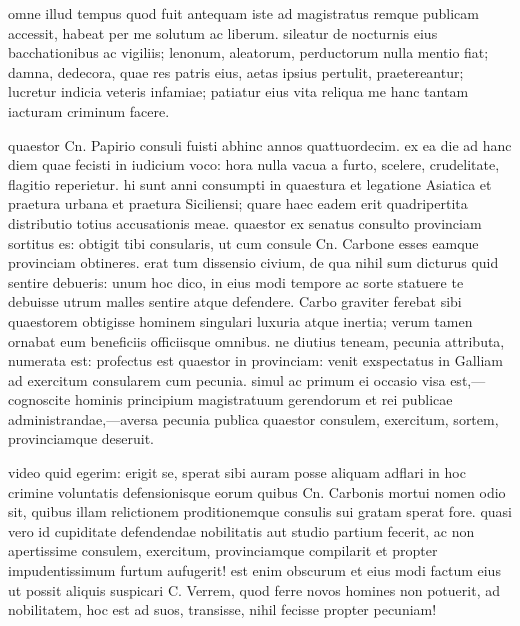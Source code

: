  omne illud tempus quod fuit antequam iste ad magistratus remque publicam accessit, habeat per me solutum ac liberum. sileatur de nocturnis eius bacchationibus ac vigiliis; lenonum, aleatorum, perductorum nulla mentio fiat; damna, dedecora, quae res patris eius, aetas ipsius pertulit, praetereantur; lucretur indicia veteris infamiae; patiatur eius vita reliqua me hanc tantam iacturam criminum facere.

 quaestor Cn. Papirio consuli fuisti abhinc annos quattuordecim. ex ea die ad hanc diem quae fecisti in iudicium voco: hora nulla vacua a furto, scelere, crudelitate, flagitio reperietur. hi sunt anni consumpti in quaestura et legatione Asiatica et praetura urbana et praetura Siciliensi; quare haec eadem erit quadripertita distributio totius accusationis meae. quaestor ex senatus consulto provinciam sortitus es: obtigit tibi consularis, ut cum consule Cn. Carbone esses eamque provinciam obtineres. erat tum dissensio civium, de qua nihil sum dicturus quid sentire debueris: unum hoc dico, in eius modi tempore ac sorte statuere te debuisse utrum malles sentire atque defendere. Carbo graviter ferebat sibi quaestorem obtigisse hominem singulari luxuria atque inertia; verum tamen ornabat eum beneficiis officiisque omnibus. ne diutius teneam, pecunia attributa, numerata est: profectus est quaestor in provinciam: venit exspectatus in Galliam ad exercitum consularem cum pecunia. simul ac primum ei occasio visa est,—cognoscite hominis principium magistratuum gerendorum et rei publicae administrandae,—aversa pecunia publica quaestor consulem, exercitum, sortem, provinciamque deseruit.

 video quid egerim: erigit se, sperat sibi auram posse aliquam adflari in hoc crimine voluntatis defensionisque eorum quibus Cn. Carbonis mortui nomen odio sit, quibus illam relictionem proditionemque consulis sui gratam sperat fore. quasi vero id cupiditate defendendae nobilitatis aut studio partium fecerit, ac non apertissime consulem, exercitum, provinciamque compilarit et propter impudentissimum furtum aufugerit! est enim obscurum et eius modi factum eius ut possit aliquis suspicari C. Verrem, quod ferre novos homines non potuerit, ad nobilitatem, hoc est ad suos, transisse, nihil fecisse propter pecuniam!

